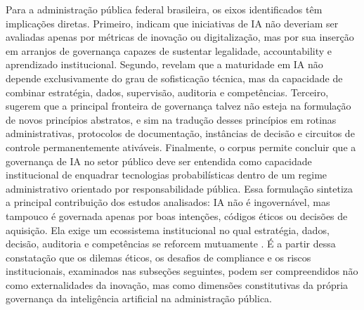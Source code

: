 \documentclass[12pt,a4paper]{article}
\begin{document}
Para a administração pública federal brasileira, os eixos identificados têm implicações diretas. Primeiro, indicam que iniciativas de IA não deveriam ser avaliadas apenas por métricas de inovação ou digitalização, mas por sua inserção em arranjos de governança capazes de sustentar legalidade, accountability e aprendizado institucional. Segundo, revelam que a maturidade em IA não depende exclusivamente do grau de sofisticação técnica, mas da capacidade de combinar estratégia, dados, supervisão, auditoria e competências. Terceiro, sugerem que a principal fronteira de governança talvez não esteja na formulação de novos princípios abstratos, e sim na tradução desses princípios em rotinas administrativas, protocolos de documentação, instâncias de decisão e circuitos de controle permanentemente ativáveis.
Finalmente, o corpus permite concluir que a governança de IA no setor público deve ser entendida como capacidade institucional de enquadrar tecnologias probabilísticas dentro de um regime administrativo orientado por responsabilidade pública. Essa formulação sintetiza a principal contribuição dos estudos analisados: IA não é ingovernável, mas tampouco é governada apenas por boas intenções, códigos éticos ou decisões de aquisição. Ela exige um ecossistema institucional no qual estratégia, dados, decisão, auditoria e competências se reforcem mutuamente \autocite{serra2024a} \autocite{criado2024artificial} \autocite{goulart2025processos}. É a partir dessa constatação que os dilemas éticos, os desafios de compliance e os riscos institucionais, examinados nas subseções seguintes, podem ser compreendidos não como externalidades da inovação, mas como dimensões constitutivas da própria governança da inteligência artificial na administração pública.
\end{document}
